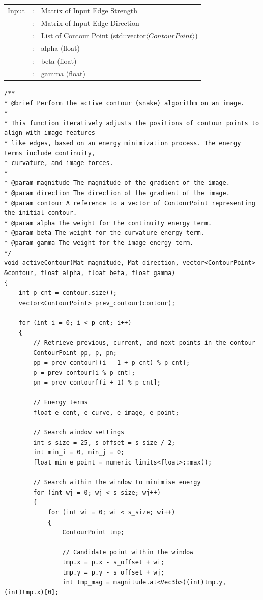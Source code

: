\documentclass[12pt,a4paper]{report}
\begin{document}
\begin{tabular}{lll}
    Input  & : & Matrix of Input Edge Strength  \\
           & : & Matrix of Input Edge Direction \\
           & : & List of Contour Point (std::vector\(\langle ContourPoint\rangle\)) \\
           & : & alpha (float)\\
           & : & beta (float)\\
           & : & gamma (float)\\
\end{tabular}
\begin{lstlisting}
/**
* @brief Perform the active contour (snake) algorithm on an image.
*
* This function iteratively adjusts the positions of contour points to align with image features
* like edges, based on an energy minimization process. The energy terms include continuity,
* curvature, and image forces.
*
* @param magnitude The magnitude of the gradient of the image.
* @param direction The direction of the gradient of the image.
* @param contour A reference to a vector of ContourPoint representing the initial contour.
* @param alpha The weight for the continuity energy term.
* @param beta The weight for the curvature energy term.
* @param gamma The weight for the image energy term.
*/
void activeContour(Mat magnitude, Mat direction, vector<ContourPoint> &contour, float alpha, float beta, float gamma)
{
    int p_cnt = contour.size();
    vector<ContourPoint> prev_contour(contour);

    for (int i = 0; i < p_cnt; i++)
    {
        // Retrieve previous, current, and next points in the contour
        ContourPoint pp, p, pn;
        pp = prev_contour[(i - 1 + p_cnt) % p_cnt];
        p = prev_contour[i % p_cnt];
        pn = prev_contour[(i + 1) % p_cnt];

        // Energy terms
        float e_cont, e_curve, e_image, e_point;

        // Search window settings
        int s_size = 25, s_offset = s_size / 2;
        int min_i = 0, min_j = 0;
        float min_e_point = numeric_limits<float>::max();

        // Search within the window to minimise energy
        for (int wj = 0; wj < s_size; wj++)
        {
            for (int wi = 0; wi < s_size; wi++)
            {
                ContourPoint tmp;

                // Candidate point within the window
                tmp.x = p.x - s_offset + wi;
                tmp.y = p.y - s_offset + wj;
                int tmp_mag = magnitude.at<Vec3b>((int)tmp.y, (int)tmp.x)[0];


\end{lstlisting}
\end{document}
